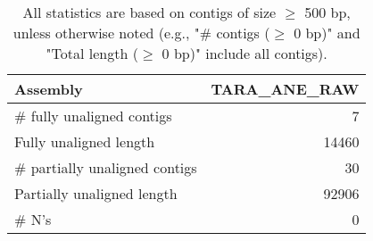 \documentclass[12pt,a4paper]{article}
\begin{document}
\begin{table}[ht]
\begin{center}
\caption{All statistics are based on contigs of size $\geq$ 500 bp, unless otherwise noted (e.g., "\# contigs ($\geq$ 0 bp)" and "Total length ($\geq$ 0 bp)" include all contigs).}
\begin{tabular}{|l*{1}{|r}|}
\hline
Assembly & TARA\_ANE\_RAW \\ \hline
\# fully unaligned contigs & 7 \\ \hline
Fully unaligned length & 14460 \\ \hline
\# partially unaligned contigs & 30 \\ \hline
Partially unaligned length & 92906 \\ \hline
\# N's & 0 \\ \hline
\end{tabular}
\end{center}
\end{table}
\end{document}
